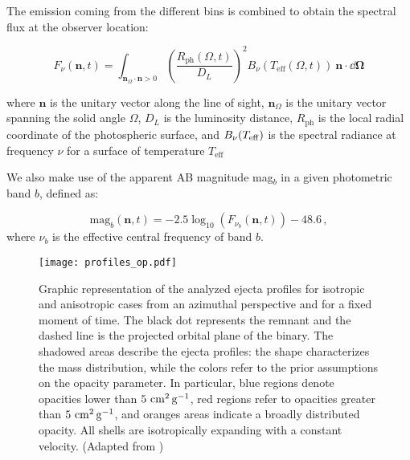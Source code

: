 The emission coming from the different bins is combined to obtain the spectral flux at the observer location:

\begin{equation}
\label{eq:spectral_flux}
F_{\nu}(\mathbf{n},t) = \int_{\mathbf{n}_{\Omega} \cdot \mathbf{n}> 0} \left( \frac{R_{\text{ph}}(\Omega,t)}{D_L} \right)^2  B_{\nu}(T_{\text{eff}}(\Omega,t))~\mathbf{n} \cdot  \dd\boldsymbol{\Omega} 
\end{equation}

where $\mathbf{n}$ is the unitary vector along the line of sight, $\mathbf{n}_{\Omega}$ is the unitary vector spanning the solid angle $\Omega$, $D_L$ is the luminosity distance, $R_{\text{ph}}$ is the local radial coordinate of the photospheric surface, and $B_{\nu}(T_{\rm eff})$ is the spectral radiance at frequency $\nu$ for a surface of temperature $T_{\text{eff}}$

We also make use of the apparent AB magnitude mag$_b$ in a given photometric band $b$, defined as:

\begin{equation}
\label{eq:mag}
\text{mag}_b(\mathbf{n},t) = -2.5 \log_{10}\left( F_{\nu_b}(\mathbf{n},t) \right)-48.6\,,
\end{equation}
where $\nu_b$ is the effective central frequency of band $b$.



\begin{figure}
    \centering 
    \texttt{[image: profiles\_op.pdf]}
    \caption{Graphic representation of the analyzed
        ejecta profiles for isotropic and anisotropic cases
        from an azimuthal perspective and for a fixed moment of time.
        The black dot represents the remnant and the dashed line is the projected orbital
        plane of the binary. The shadowed areas describe the ejecta profiles: the shape
        characterizes the mass distribution, while the colors refer to 
        the prior assumptions on the opacity parameter.
        In particular, blue regions denote opacities lower than $5~{\rm cm^{2}\,g^{-1}}$,
        red regions refer to opacities greater than $5~{\rm cm^{2}\,g^{-1}}$,
        and oranges areas indicate a broadly distributed opacity.
        All shells are isotropically expanding with a constant velocity.
        (Adapted from \citet{Breschi:2021wzr})
    }
    \label{fig:cartoon}
\end{figure}


